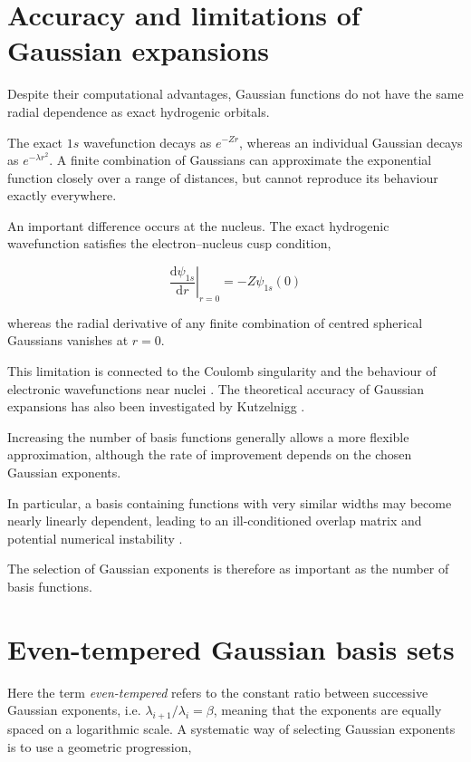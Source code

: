 \section{Accuracy and limitations of Gaussian expansions}

Despite their computational advantages, Gaussian
functions do not have the same radial dependence
as exact hydrogenic orbitals.

The exact \(1s\) wavefunction decays as \(e^{-Zr}\),
whereas an individual Gaussian decays as
\(e^{-\lambda r^2}\). A finite combination of
Gaussians can approximate the exponential function
closely over a range of distances, but cannot
reproduce its behaviour exactly everywhere.

An important difference occurs at the nucleus.
The exact hydrogenic wavefunction satisfies the
electron--nucleus cusp condition,

\begin{equation}
    \left.
    \frac{\mathrm d\psi_{1s}}{\mathrm dr}
    \right|_{r=0}
    =-Z\psi_{1s}(0)
    \label{eq:intro_cusp}
\end{equation}

whereas the radial derivative of any finite
combination of centred spherical Gaussians
vanishes at \(r=0\).

This limitation is connected to the Coulomb
singularity and the behaviour of electronic
wavefunctions near nuclei \cite{Kato}.
The theoretical accuracy of Gaussian expansions
has also been investigated by Kutzelnigg
\cite{Kutzelnigg1994}.

Increasing the number of basis functions generally
allows a more flexible approximation, although
the rate of improvement depends on the chosen
Gaussian exponents.

In particular, a basis containing functions
with very similar widths may become nearly
linearly dependent, leading to an ill-conditioned
overlap matrix and potential numerical instability
\cite{Lehtola2019}.

The selection of Gaussian exponents is therefore
as important as the number of basis functions.


\section{Even-tempered Gaussian basis sets}
Here the term \textit{even-tempered} refers to the constant
ratio between successive Gaussian exponents, i.e.
$\lambda_{i+1}/\lambda_i=\beta$, meaning that
the exponents are equally spaced on a logarithmic scale.
A systematic way of selecting Gaussian exponents
is to use a geometric progression,

